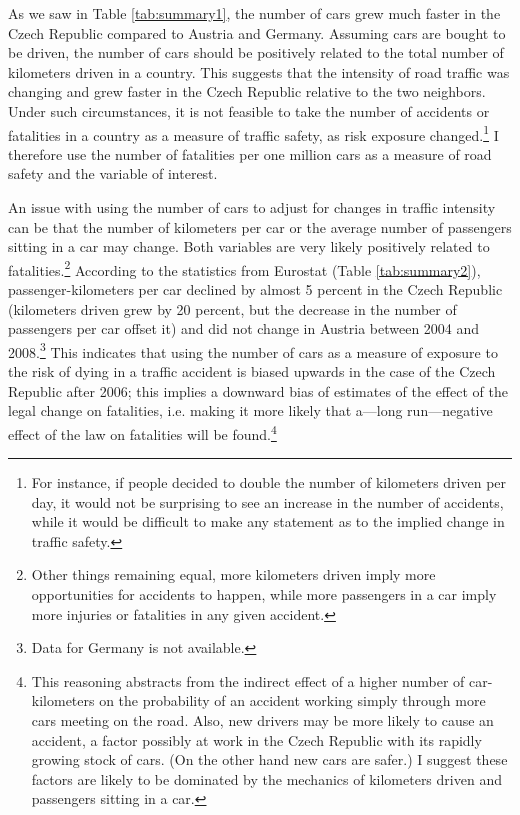 \documentclass[12pt]{article}
\begin{document}
As we saw in Table \ref{tab:summary1}, the number of cars grew much faster in
the Czech Republic compared to Austria and Germany. Assuming cars are bought to
be driven, the number of cars should be positively related to the total number
of kilometers driven in a country.  This suggests that the intensity of road
traffic was changing and grew faster in the Czech Republic relative to the two
neighbors. Under such circumstances, it is not feasible to take the number of
accidents or fatalities in a country as a measure of traffic safety, as risk
exposure changed.\footnote{For instance, if people decided to double the number
of kilometers driven per day, it would not be surprising to see an increase in
the number of accidents, while it would be difficult to make any statement as
to the implied change in traffic safety.}  I therefore use the number of
fatalities per one million cars as a measure of road safety and the variable of
interest.

An issue with using the number of cars to adjust for changes in traffic
intensity can be that the number of kilometers per car or the average number of
passengers sitting in a car may change. Both variables are very likely
positively related to fatalities.\footnote{Other things remaining equal, more
kilometers driven imply more opportunities for accidents to happen, while more
passengers in a car imply more injuries or fatalities in any given accident.}
According to the statistics from Eurostat (Table \ref{tab:summary2}),
passenger-kilometers per car declined by almost 5 percent in the Czech Republic
(kilometers driven grew by 20 percent, but the decrease in the number of
passengers per car offset it) and did not change in Austria between 2004 and
2008.\footnote{Data for Germany is not available.} This indicates that using the
number of cars as a measure of exposure to the risk of dying in a traffic
accident is biased upwards in the case of the Czech Republic after 2006; this
implies a downward bias of estimates of the effect of the legal change on
fatalities, i.e.  making it more likely that a---long run---negative effect of
the law on fatalities will be found.\footnote{This reasoning abstracts from the
indirect effect of a higher number of car-kilometers on the probability of an
accident working simply through more cars meeting on the road.  Also, new
drivers may be more likely to cause an accident, a factor possibly at work in
the Czech Republic with its rapidly growing stock of cars.  (On the other hand
new cars are safer.) I suggest these factors are likely to be dominated by the
mechanics of kilometers driven and passengers sitting in a car.}
\end{document}
